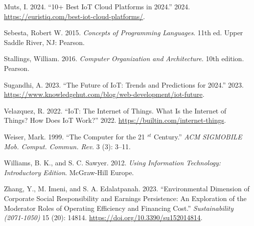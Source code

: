 \documentclass[
  letterpaper,
  DIV=11,
  numbers=noendperiod]{scrreprt}
\newlength{\cslhangindent}
\newenvironment{CSLReferences}[2] %
 {\begin{list}{}{%
  \setlength{\itemindent}{0pt}
  \setlength{\leftmargin}{0pt}
  \setlength{\parsep}{0pt}
  \ifodd #1
   \setlength{\leftmargin}{\cslhangindent}
   \setlength{\itemindent}{-1\cslhangindent}
  \fi
  \setlength{\itemsep}{#2\baselineskip}}}
 {\end{list}}
\begin{document}
\begin{CSLReferences}{1}{0}
Muts, I. 2024. {``10+ Best IoT Cloud Platforms in 2024.''} 2024.
\url{https://euristiq.com/best-iot-cloud-platforms/}.

Sebesta, Robert W. 2015. \emph{Concepts of Programming Languages}. 11th
ed. Upper Saddle River, NJ: Pearson.

Stallings, William. 2016. \emph{Computer Organization and Architecture}.
10th edition. Pearson.

Sugandhi, A. 2023. {``The Future of IoT: Trends and Predictions for
2024.''} 2023.
\url{https://www.knowledgehut.com/blog/web-development/iot-future}.

Velazquez, R. 2022. {``IoT: The Internet of Things. What Is the Internet
of Things? How Does IoT Work?''} 2022.
\url{https://builtin.com/internet-things}.

Weiser, Mark. 1999. {``The Computer for the 21 \(^{st}\) Century.''}
\emph{ACM SIGMOBILE Mob. Comput. Commun. Rev.} 3 (3): 3--11.

Williams, B. K., and S. C. Sawyer. 2012. \emph{Using Information
Technology: Introductory Edition}. McGraw-Hill Europe.

Zhang, Y., M. Imeni, and S. A. Edalatpanah. 2023. {``Environmental
Dimension of Corporate Social Responsibility and Earnings Persistence:
An Exploration of the Moderator Roles of Operating Efficiency and
Financing Cost.''} \emph{Sustainability (2071-1050)} 15 (20): 14814.
\url{https://doi.org/10.3390/su152014814}.

\end{CSLReferences}
\end{document}
